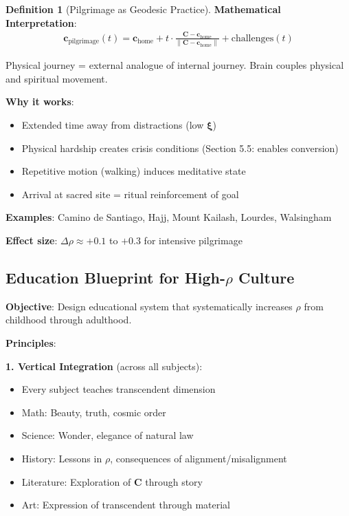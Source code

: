 \documentclass[11pt,a4paper]{article}
\theoremstyle{definition}
\newtheorem{definition}{Definition}[section]
\theoremstyle{remark}
\newcommand{\cc}{\mathbf{c}}
\begin{document}
\begin{enumerate}
\begin{protocol}
\begin{definition}[Pilgrimage as Geodesic Practice]
\textbf{Mathematical Interpretation}:
\begin{align}
\cc_{\text{pilgrimage}}(t) = \cc_{\text{home}} + t \cdot \frac{\mathbf{C} - \cc_{\text{home}}}{\|\mathbf{C} - \cc_{\text{home}}\|} + \text{challenges}(t)
\end{align}

Physical journey = external analogue of internal journey. Brain couples physical and spiritual movement.

\textbf{Why it works}:
\begin{itemize}
    \item Extended time away from distractions (low \(\boldsymbol{\xi}\))
    \item Physical hardship creates crisis conditions (Section 5.5: enables conversion)
    \item Repetitive motion (walking) induces meditative state
    \item Arrival at sacred site = ritual reinforcement of goal
\end{itemize}

\textbf{Examples}: Camino de Santiago, Hajj, Mount Kailash, Lourdes, Walsingham

\textbf{Effect size}: \(\Delta\rho \approx +0.1\) to \(+0.3\) for intensive pilgrimage
\end{definition}

\subsection{Education Blueprint for High-\(\rho\) Culture}

\begin{protocol}
\textbf{Objective}: Design educational system that systematically increases \(\rho\) from childhood through adulthood.

\textbf{Principles}:

\textbf{1. Vertical Integration} (across all subjects):
\begin{itemize}
    \item Every subject teaches transcendent dimension
    \item Math: Beauty, truth, cosmic order
    \item Science: Wonder, elegance of natural law
    \item History: Lessons in \(\rho\), consequences of alignment/misalignment
    \item Literature: Exploration of \(\mathbf{C}\) through story
    \item Art: Expression of transcendent through material
\end{itemize}


\end{protocol}
\end{protocol}
\end{enumerate}
\end{document}
